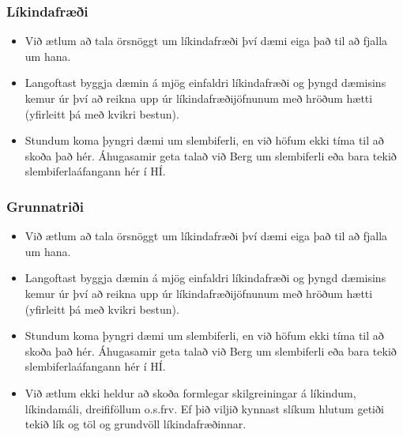 \documentclass{beamer}
\begin{document}
\begin{frame}
\frametitle{Líkindafræði}

\begin{itemize}

\item<1-> Við ætlum að tala örsnöggt um líkindafræði því dæmi eiga það til að fjalla um hana.

\item<2-> Langoftast byggja dæmin á mjög einfaldri líkindafræði og þyngd dæmisins kemur úr því að reikna upp úr líkindafræðijöfnunum með hröðum hætti (yfirleitt þá með kvikri bestun).

\item<3-> Stundum koma þyngri dæmi um slembiferli, en við höfum ekki tíma til að skoða það hér. Áhugasamir geta talað við Berg um slembiferli eða bara tekið slembiferlaáfangann hér í HÍ.

\end{itemize}

\end{frame}

\begin{frame}
\frametitle{Grunnatriði}

\begin{itemize}

\item<1-> Við ætlum að tala örsnöggt um líkindafræði því dæmi eiga það til að fjalla um hana.

\item<2-> Langoftast byggja dæmin á mjög einfaldri líkindafræði og þyngd dæmisins kemur úr því að reikna upp úr líkindafræðijöfnunum með hröðum hætti (yfirleitt þá með kvikri bestun).

\item<3-> Stundum koma þyngri dæmi um slembiferli, en við höfum ekki tíma til að skoða það hér. Áhugasamir geta talað við Berg um slembiferli eða bara tekið slembiferlaáfangann hér í HÍ.

\item<4-> Við ætlum ekki heldur að skoða formlegar skilgreiningar á líkindum, líkindamáli, dreififöllum o.s.frv. Ef þið viljið kynnast slíkum hlutum getiði tekið lík og töl og grundvöll líkindafræðinnar.

\end{itemize}

\end{frame}
\end{document}
